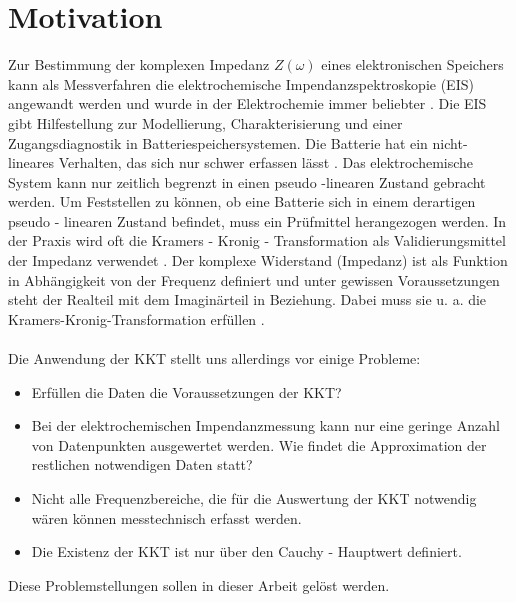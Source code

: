 \chapter{Motivation}
Zur Bestimmung der komplexen Impedanz $Z(\omega)$ eines elektronischen Speichers kann als Messverfahren die elektrochemische Impendanzspektroskopie (EIS) angewandt werden und wurde in der Elektrochemie immer beliebter \cite[Seite XIII]{MacDonald2005}. Die EIS gibt Hilfestellung zur Modellierung, Charakterisierung und einer Zugangsdiagnostik in Batteriespeichersystemen.  Die Batterie hat ein nicht-lineares Verhalten, das sich nur schwer erfassen lässt \cite[Seite 3]{Mauracher1996}. Das elektrochemische System kann nur zeitlich begrenzt in einen pseudo -linearen Zustand gebracht werden. Um Feststellen zu können, ob eine Batterie sich in einem derartigen pseudo - linearen Zustand befindet, muss ein Prüfmittel herangezogen werden. In der Praxis wird oft die Kramers - Kronig - Transformation als Validierungsmittel der Impedanz verwendet \cite{Boukamp1993} \cite{Urquidi-Macdonald1986} \cite{Triverio2006b}. Der komplexe Widerstand (Impedanz) ist als Funktion in Abhängigkeit von der Frequenz definiert und unter gewissen Voraussetzungen steht der Realteil mit dem Imaginärteil in Beziehung. Dabei muss sie u. a. die Kramers-Kronig-Transformation erfüllen \cite[Seite 7]{MacDonald2005}. \\\\
Die Anwendung der KKT stellt uns allerdings vor einige Probleme:
\begin{itemize}
 	\item Erfüllen die Daten die Voraussetzungen der KKT?
	\item Bei der elektrochemischen Impendanzmessung kann nur eine geringe Anzahl von Datenpunkten ausgewertet werden. Wie findet die Approximation der restlichen notwendigen Daten statt?
	\item Nicht alle Frequenzbereiche, die für die Auswertung der KKT notwendig wären können messtechnisch erfasst werden.
	\item Die Existenz der KKT ist nur über den Cauchy - Hauptwert definiert.
\end{itemize}
Diese Problemstellungen sollen in dieser Arbeit gelöst werden.